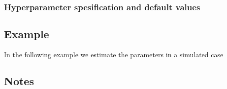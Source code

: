 \documentclass[a4paper,11pt]{article}
\begin{document}
\subsubsection*{Hyperparameter spesification and default values}



\subsection*{Example}

In the following example we estimate the parameters in a simulated
case%


\subsection*{Notes}
\end{document}
